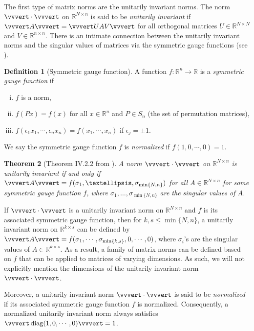 \documentclass[reqno]{amsart}
\DeclareMathOperator{\diag}{diag}
\theoremstyle{plain}
\newtheorem{theorem}{Theorem}
\theoremstyle{definition}
\newtheorem{definition}[theorem]{Definition}
\begin{document}
The first type of matrix norms are the unitarily invariant norms. The norm $\vvvert \cdot \vvvert $ on $\mathbb R^{N\times n}$ is said to be \emph{unitarily invariant} if $\vvvert A\vvvert  = \vvvert UAV\vvvert $ for all orthogonal matrices $U \in \mathbb R^{N\times N}$ and $V \in \mathbb R^{n\times n}$. There is an intimate connection between the unitarily invariant norms and the singular values of matrices via the symmetric gauge functions (see \cite[Section IV]{Bhatia}). 
\begin{definition}[Symmetric gauge function]
A function $f: \mathbb R^n \to \mathbb R$ is a \emph{symmetric gauge function} if 
\begin{enumerate}[(i)]
\item $f$ is a norm,
\item $f(P x) = f(x)$ for all $x\in \mathbb R^n$ and $P\in S_n$ (the set of permutation matrices),
\item $f(\epsilon_1 x_1, \cdots, \epsilon_n x_n) = f( x_1, \cdots, x_n)$ if $\epsilon_j = \pm 1$.
\end{enumerate}
\end{definition}
We say the symmetric gauge function $f$ is \emph{normalized} if
$f(1,0,\cdots,0)=1.$
\begin{theorem}[Theorem IV.2.2 from \cite{Bhatia}]\label{thm:char}A norm $\vvvert \cdot \vvvert $ on $\mathbb{R}^{N \times n}$ is unitarily invariant if and only if $\vvvert A \vvvert  = f(\sigma_1, \dots, \sigma_{\min\{N,n\}})$ for all $A \in \mathbb{R}^{N \times n}$ for some symmetric gauge function $f$, where $\sigma_1, \dots, \sigma_{\min\{N,n\}}$ are the singular values of $A$.
\end{theorem}
If $\vvvert \cdot \vvvert $ is a unitarily invariant norm on $\mathbb R^{N\times n}$ and $f$ is its associated symmetric gauge function, then for $k,s\le \min\{N, n\}$, a unitarily invariant norm on $\mathbb R^{k\times s}$ can be defined by $\vvvert A \vvvert = f(\sigma_1, \cdots, \sigma_{\min\{k,s\}},0,\cdots,0)$, where $\sigma_i$'s are the singular values of $A\in \mathbb R^{k\times s}$. As a result, a family of matrix norms can be defined based on $f$ that can be applied to matrices of varying dimensions. As such, we will not explicitly mention the dimensions of the unitarily invariant norm $\vvvert \cdot \vvvert $.%

Moreover, a unitarily invariant norm $\vvvert \cdot \vvvert $ is said to be \emph{normalized} if its associated symmetric gauge function $f$ is {normalized}. Consequently, a normalized unitarily invariant norm always satisfies $\vvvert \diag(1,0,\cdots,0) \vvvert =1$.
\end{document}
